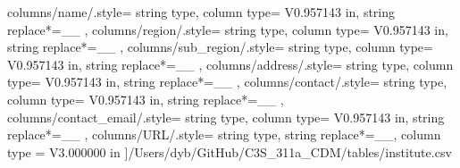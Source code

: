 \begin{landscape}
    columns/name/.style={
            string type, 
            column type= V{0.957143 in}, 
            string replace*={_}{\_}
        },
    columns/region/.style={
            string type, 
            column type= V{0.957143 in}, 
            string replace*={_}{\_}
        },
    columns/sub_region/.style={
            string type, 
            column type= V{0.957143 in}, 
            string replace*={_}{\_}
        },
    columns/address/.style={
            string type, 
            column type= V{0.957143 in}, 
            string replace*={_}{\_}
        },
    columns/contact/.style={
            string type, 
            column type= V{0.957143 in}, 
            string replace*={_}{\_}
        },
    columns/contact_email/.style={
            string type, 
            column type= V{0.957143 in}, 
            string replace*={_}{\_}
        },
    columns/URL/.style={
            string type, 
            string replace*={_}{\_},
            column type = V{3.000000 in}
        }
    ]{/Users/dyb/GitHub/C3S_311a_CDM/tables/institute.csv}
\end{landscape}
